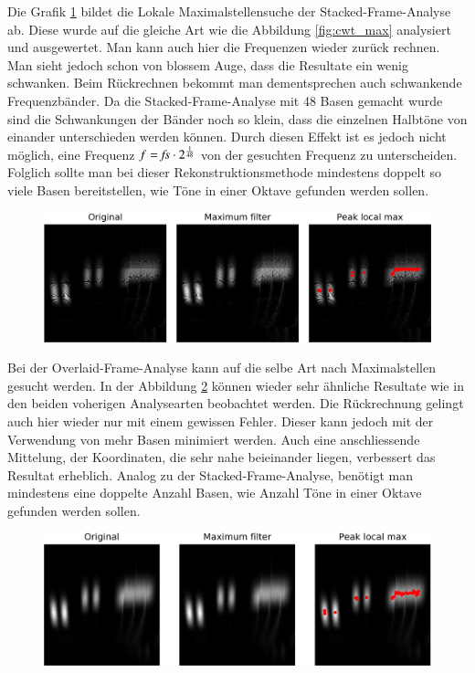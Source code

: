Die Grafik \ref{fig:stacked_max} bildet die Lokale Maximalstellensuche der Stacked-Frame-Analyse ab. Diese wurde auf die gleiche Art wie die Abbildung \ref{fig:cwt_max} analysiert und ausgewertet. Man kann auch hier die Frequenzen wieder zurück rechnen. Man sieht jedoch schon von blossem Auge, dass die Resultate ein wenig schwanken. Beim Rückrechnen bekommt man dementsprechen auch schwankende Frequenzbänder. Da die Stacked-Frame-Analyse mit 48 Basen gemacht wurde sind die Schwankungen der Bänder noch so klein, dass die einzelnen Halbtöne von einander unterschieden werden können. Durch diesen Effekt ist es jedoch nicht möglich, eine Frequenz
$f= \fs\cdot 2^{\frac{1}{48}}$
von der gesuchten Frequenz zu unterscheiden. Folglich sollte man bei dieser Rekonstruktionsmethode mindestens doppelt so viele Basen bereitstellen, wie Töne in einer Oktave gefunden werden sollen. 
\begin{figure}
\centering
\includegraphics[width=\linewidth]{papers/autotune/sections/frames/images/Stacked/dwtmaxima-clipped.jpg}
\label{fig:stacked_max}
\end{figure}%


Bei der Overlaid-Frame-Analyse kann auf die selbe Art nach Maximalstellen gesucht werden. In der Abbildung \ref{fig:overlaid_max} können wieder sehr ähnliche Resultate wie in den beiden voherigen Analysearten beobachtet werden. Die Rückrechnung gelingt auch hier wieder nur mit einem gewissen Fehler. Dieser kann jedoch mit der Verwendung von mehr Basen minimiert werden.  Auch eine anschliessende Mittelung, der Koordinaten, die sehr nahe beieinander liegen, verbessert das Resultat erheblich. Analog zu der Stacked-Frame-Analyse, benötigt man mindestens eine doppelte Anzahl Basen, wie Anzahl Töne in einer Oktave gefunden werden sollen.
\begin{figure}
\centering
\includegraphics[width=\linewidth]{papers/autotune/sections/frames/images/Overlaid/dwtmaxima-clipped.jpg}
\label{fig:overlaid_max}
\end{figure}%


